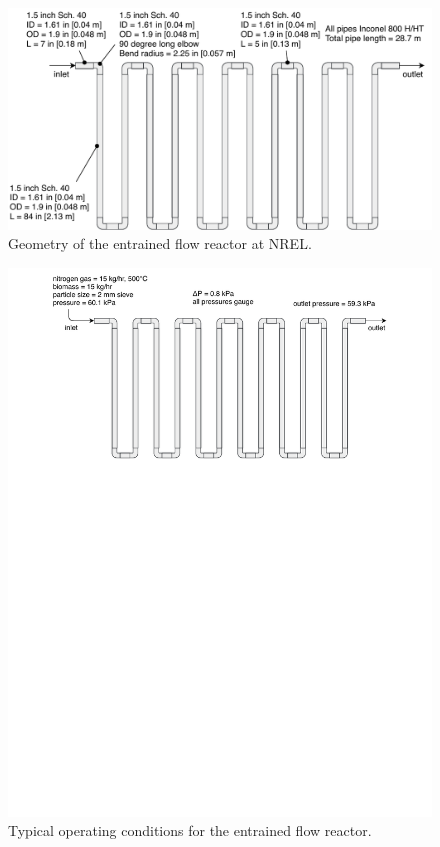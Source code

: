 \begin{figure}[H]
	\centering
	\includegraphics[width=\textwidth]{figures/efr-geometry.pdf}
	\caption{Geometry of the entrained flow reactor at NREL.}
	\label{fig:efr-geometry}
\end{figure}

\begin{figure}[H]
	\centering
	\includegraphics[width=\textwidth]{figures/efr-flow.pdf}
	\caption{Typical operating conditions for the entrained flow reactor.}
	\label{fig:efr-flow}
\end{figure}

